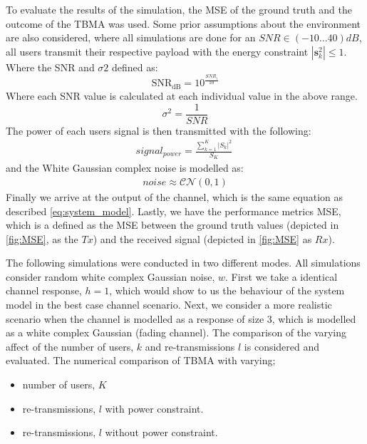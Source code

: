 \documentclass{article}
\begin{document}
To evaluate the results of the simulation, the \ac{MSE} of the ground truth and the outcome of the TBMA was used. Some prior assumptions about the environment are also considered, where all simulations are done for an $SNR \in (-10\dots40)dB$, all users transmit their respective payload with the energy constraint  $|\textbf{s}_{k}^2| \leq 1$.  
Where the SNR and $\sigma2$ defined as:
\begin{equation} 
\text{SNR}_{\text{dB}} = 10^{\frac{SNR_{i}}{10}}    
\end{equation}
Where each SNR value is calculated at each individual value in the above range.
\begin{equation}
    \sigma^2 = \frac{1}{SNR}
\end{equation}
The power of each users signal is then transmitted with the following:
\begin{align}
    signal_{power} = \frac{\sum\limits_{k=1}^{K}|S_{k}|^2 }{S_{K}} \     
\end{align}
and the White Gaussian complex noise is modelled as:
\begin{align}
    noise \approx \mathcal{CN}(0,1)
\end{align}
Finally we arrive at the output of the channel, which is the same equation as described \cref{eq:system_model}. Lastly, we have the performance metrics MSE, which is a defined as the MSE between the ground truth values (depicted in \ref{fig:MSE}, as the $Tx$) and the received signal (depicted in \ref{fig:MSE} as $Rx$).


The following simulations were conducted in two different modes. All simulations consider random white complex Gaussian noise, $w$. First we take a identical channel response, $h=1$, which would show to us the behaviour of the system model in the best case channel scenario. Next, we consider a more realistic scenario when the channel is modelled as a response of size 3, which is modelled as a white complex Gaussian (fading channel). The comparison of the varying affect of the number of users, $k$ and re-transmissions $l$ is considered and evaluated. 
The numerical comparison of TBMA with varying;
\begin{itemize}
    \item number of users, $K$
    \item re-transmissions, $l$ with power constraint.    
    \item re-transmissions, $l$ without power constraint.
\end{itemize}
\end{document}
